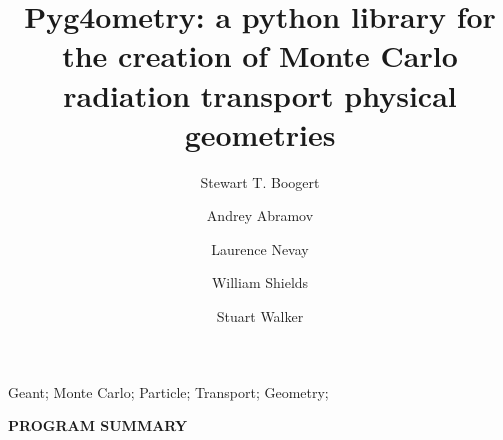 \documentclass[final,5p,times,twocolumn]{elsarticle}
\begin{document}
\begin{frontmatter}



\title{Pyg4ometry: a python library for the creation of Monte Carlo radiation transport physical geometries}


\author[a]{Stewart T. Boogert}
\author[a]{Andrey Abramov}
\author[a]{Laurence Nevay}
\author[a]{William Shields}
\author[a]{Stuart Walker}

\address[a]{John Adams Institute at Royal Holloway, Department of Physics, Royal Holloway, Egham, TW20 0EX, Surrey, UK}

\begin{abstract}
\end{abstract}

\begin{keyword}
Geant; Monte Carlo; Particle; Transport; Geometry; 

\end{keyword}

\end{frontmatter}



\linenumbers

{\bf PROGRAM SUMMARY}
\end{document}
